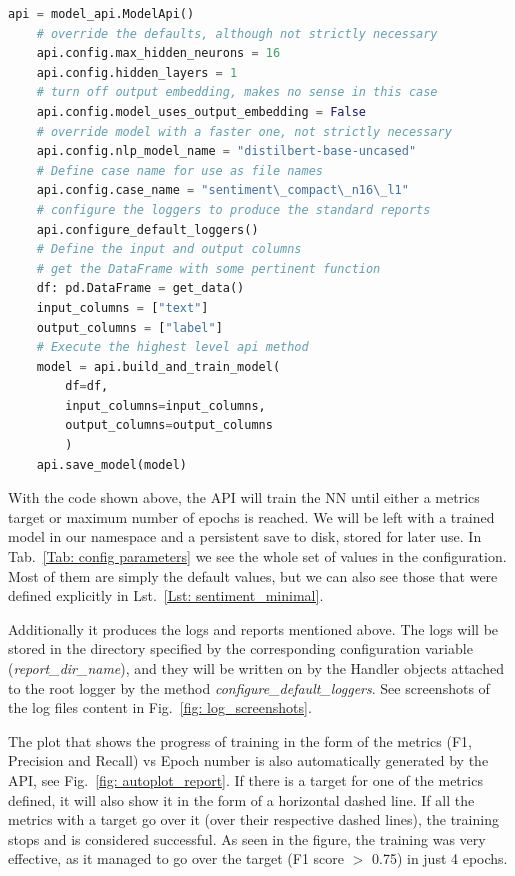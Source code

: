 \documentclass[a4paper, 11pt]{report}
\begin{document}
\begin{minipage}{0.95\linewidth}\vspace{5mm}
\begin{lstlisting}[frame=single, language=Python, title=A minimal code, caption=Simple code using the api to train a NN in sentiment recognition. Dataset is assumed to be given through the get\_data() method, label=Lst: sentiment_minimal ]
    api = model_api.ModelApi()
    # override the defaults, although not strictly necessary
    api.config.max_hidden_neurons = 16
    api.config.hidden_layers = 1
    # turn off output embedding, makes no sense in this case
    api.config.model_uses_output_embedding = False
    # override model with a faster one, not strictly necessary
    api.config.nlp_model_name = "distilbert-base-uncased"
    # Define case name for use as file names
    api.config.case_name = "sentiment\_compact\_n16\_l1"
    # configure the loggers to produce the standard reports
    api.configure_default_loggers()
    # Define the input and output columns
    # get the DataFrame with some pertinent function
    df: pd.DataFrame = get_data()
    input_columns = ["text"]
    output_columns = ["label"]
    # Execute the highest level api method
    model = api.build_and_train_model(
        df=df,
        input_columns=input_columns,
        output_columns=output_columns
        )
    api.save_model(model)
\end{lstlisting}
\end{minipage}

With the code shown above, the API will train the NN until either a metrics target or maximum number of epochs is reached. We will be left with a trained model in our namespace and a persistent save to disk, stored for later use.  In Tab.~\ref{Tab: config parameters} we see the whole set of values in the configuration. Most of them are simply the default values, but we can also see those that were defined explicitly in Lst.~\ref{Lst: sentiment_minimal}.

Additionally it produces the logs and reports mentioned above. The logs will be stored in the directory specified by the corresponding configuration variable (\textit{report\_dir\_name}), and they will be written on by the Handler objects attached to the root logger by the method \textit{configure\_default\_loggers}. See screenshots of the log files content in Fig.~\ref{fig: log_screenshots}.

The plot that shows the progress of training in the form of the metrics (F1, Precision and Recall) vs Epoch number is also automatically generated by the API, see Fig.~\ref{fig: autoplot_report}. If there is a target for one of the metrics defined, it will also show it in the form of a horizontal dashed line. If all the metrics with a target go over it (over their respective dashed lines), the training stops and is considered successful. As seen in the figure, the training was very effective, as it managed to go over the target (F1 score $>$ 0.75) in just 4 epochs.
\end{document}
